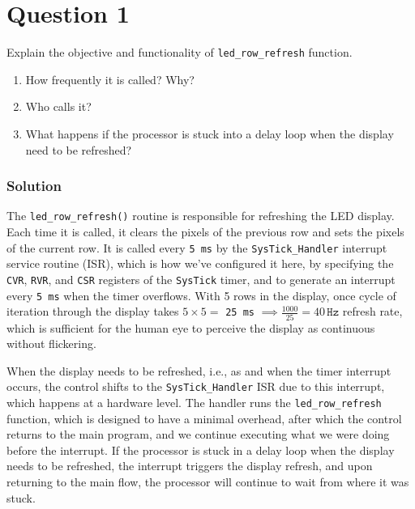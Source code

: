 \section*{Question 1}

Explain the objective and functionality of \texttt{led\_row\_refresh} function.

\begin{enumerate}[label= (\alph*), noitemsep, topsep=0pt]
    \item How frequently it is called? Why?
    \item Who calls it?
    \item What happens if the processor is stuck into a delay loop when the display need to be refreshed?
\end{enumerate}

\subsubsection*{Solution}

The \texttt{led\_row\_refresh\@()} routine is responsible for refreshing the LED display.
Each time it is called, it clears the pixels of the previous row and sets the pixels of the current row.
It is called every \texttt{5\,\texttt{ms}} by the \texttt{SysTick\_Handler} interrupt service routine (ISR), which is how we've configured it here, by specifying the \texttt{CVR}, \texttt{RVR}, and \texttt{CSR} registers of the \texttt{SysTick} timer, and to generate an interrupt every \texttt{5\,\texttt{ms}} when the timer overflows.
With 5 rows in the display, once cycle of iteration through the display takes \( 5 \times 5 = \) \texttt{25\,\texttt{ms}} \( \implies \frac{1000}{25} = 40\,\texttt{Hz} \) refresh rate, which is sufficient for the human eye to perceive the display as continuous without flickering.

When the display needs to be refreshed, i.e., as and when the timer interrupt occurs, the control shifts to the \texttt{SysTick\_Handler} ISR due to this interrupt, which happens at a hardware level.
The handler runs the \texttt{led\_row\_refresh} function, which is designed to have a minimal overhead, after which the control returns to the main program, and we continue executing what we were doing before the interrupt.
If the processor is stuck in a delay loop when the display needs to be refreshed, the interrupt triggers the display refresh, and upon returning to the main flow, the processor will continue to wait from where it was stuck.
